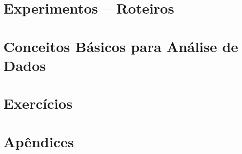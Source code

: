 \documentclass[12pt,a4paper,]{book}
\begin{document}



\tableofcontents

\newpage

%





\part{Experimentos -- Roteiros}







\part[Conceitos Básicos para Análise de Dados]{Conceitos Básicos para Análise de Dados}

\setcounter{chapter}{0}







%
%
%
%
%
%

\part{Exercícios}



%
%

\part{Apêndices}
\appendix 







\end{document}
